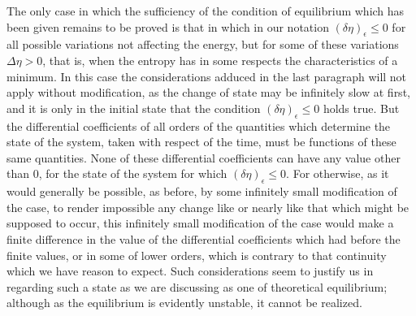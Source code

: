 \documentclass[11pt]{article}
\newcommand{\eps}{\epsilon}
\newcommand{\D}{\Delta}
\begin{document}
The only case in which the sufficiency of the condition of equilibrium which has been given remains to be proved is that in which in our notation \((\delta\eta)_{\eps}\leq 0\) for all possible variations not affecting the energy, but for some of these variations \(\D\eta>0\), that is, when the entropy has in some respects the characteristics of a minimum. In this case the considerations adduced in the last paragraph will not apply without modification, as the change of state may be infinitely slow at first, and it is only in the initial state that the condition \((\delta\eta)_{\eps}\leq 0\) holds true. But the differential coefficients of all orders of the quantities which determine the state of the system, taken with respect of the time, must be functions of these same quantities. None of these differential coefficients can have any value other than 0, for the state of the system for which \((\delta\eta)_{\eps}\leq 0\). For otherwise, as it would generally be possible, as before, by some infinitely small modification of the case, to render impossible any change like or nearly like that which might be supposed to occur, this infinitely small modification of the case would make a finite difference in the value of the differential coefficients which had before the finite values, or in some of lower orders, which is contrary to that continuity which we have reason to expect. Such considerations seem to justify us in regarding such a state as we are discussing as one of theoretical equilibrium; although as the equilibrium is evidently unstable, it cannot be realized.
\end{document}
